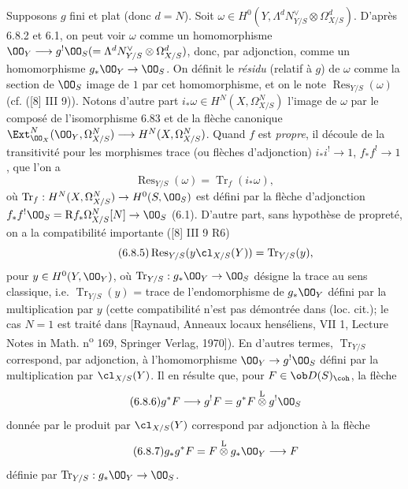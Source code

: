 Supposons $g$ fini et plat (donc $d=N$). Soit $\omega\in H^0(Y,\Lambda^d N_{Y/S}^{\vee}\otimes\Omega^d_{X/S})$. D'après 6.8.2 et 6.1, on peut voir $\omega$ comme un homomorphisme $\OO_Y\longrightarrow g^!\OO_S(=\Lambda^d N_{Y/S}^{\vee}\otimes\Omega^d_{X/S})$, donc, par adjonction, comme un homomorphisme $g_*\OO_Y\to\OO_S$. On définit le \emph{résidu} (relatif à $g$) de $\omega$ comme la section de $\OO_S$ image de $1$ par cet homomorphisme, et on le note $\operatorname{Res}_{Y/S}(\omega)$ (cf. ([8] III 9)). Notons d'autre part $i_*\omega\in H^N(X,\Omega^N_{X/S})$ l'image de $\omega$ par le composé de l'isomorphisme 6.83 et de la flèche canonique $\Ext^N_{\OO_X}(\OO_Y,\Omega^N_{X/S})\longrightarrow H^N(X,\Omega^N_{X/S})$. Quand $f$ est \emph{propre}, il découle de la transitivité pour les morphismes trace (ou flèches d'adjonction) $i_*i^!\to 1$, $f_*f^!\to 1$, que l'on a
\begin{equation}
\tag{6.8.4}
\operatorname{Res}_{Y/S}(\omega)=\operatorname{Tr}_f(i_*\omega),
\end{equation}
où $\operatorname{Tr}_f:H^N(X,\Omega^N_{X/S})\to H^0(S,\OO_S)$ est défini par la flèche d'adjonction $f_*f^!\OO_S=\mathrm{R} f_*\Omega^N_{X/S}[N]\to\OO_S$ (6.1). D'autre part, sans hypothèse de propreté, on a la compatibilité importante ([8] III 9 R6)
\begin{equation}
\tag{6.8.5}
\operatorname{Res}_{Y/S}(y\cl_{X/S}(Y))=\operatorname{Tr}_{Y/S}(y),
\end{equation}
pour $y\in H^0(Y,\OO_Y)$, où $\operatorname{Tr}_{Y/S}:g_*\OO_Y\to\OO_S$ désigne la trace au sens classique, i.e. $\operatorname{Tr}_{Y/S}(y)$ = trace de l'endomorphisme de $g_*\OO_Y$ défini par la multiplication par $y$ (cette compatibilité n'est pas démontrée dans (loc. cit.); le cas $N=1$ est traité dans [Raynaud, Anneaux locaux henséliens, VII 1, Lecture Notes in Math. n\textsuperscript{o} 169, Springer Verlag, 1970]). En d'autres termes, $\operatorname{Tr}_{Y/S}$ correspond, par adjonction, à l'homomorphisme $\OO_Y\to g^!\OO_S$ défini par la multiplication par $\cl_{X/S}(Y)$. Il en résulte que, pour $F\in\ob D(S)_{\coh}$, la flèche
\begin{equation}
\tag{6.8.6}
g^*F\longrightarrow g^!F=g^*F\overset{\mathrm{L}}{\otimes}g^!\OO_S
\end{equation}
donnée par le produit par $\cl_{X/S}(Y)$ correspond par adjonction à la flèche
\begin{equation}
\tag{6.8.7}
g_*g^*F=F\overset{\mathrm{L}}{\otimes}g_*\OO_Y\longrightarrow F
\end{equation}
définie par $\operatorname{Tr}_{Y/S}:g_*\OO_Y\to\OO_S$.


